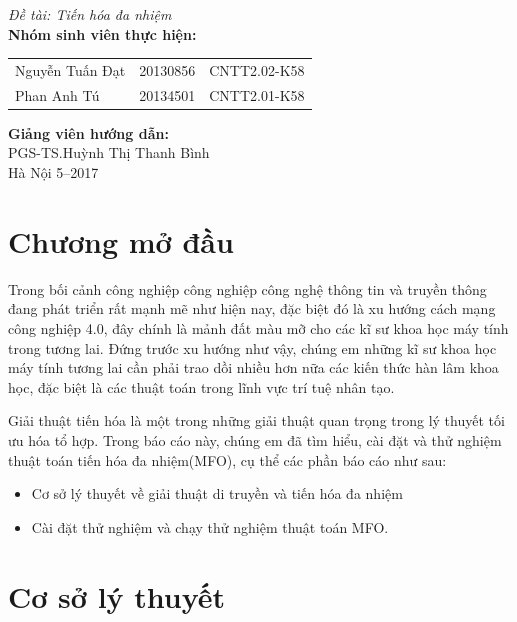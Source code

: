 \documentclass[a4paper,12pt]{report}
\renewcommand{\contentsname}{Mục lục}
\begin{document}
\begin{center}
{\fontsize{18}{20}\selectfont \emph{Đề tài: Tiến hóa đa nhiệm }}\\[2cm]
\hspace{-5cm}\fontsize{14}{16}\selectfont \textbf{Nhóm sinh viên thực hiện:}\\[0.1cm] 
\begin{longtable}{l c c}
Nguyễn Tuấn Đạt & 20130856 & CNTT2.02-K58 \\
Phan Anh Tú &   20134501 & CNTT2.01-K58\\
\end{longtable}
\vspace{0.5cm}
\hspace{-6cm}\fontsize{14}{16}\selectfont \textbf{Giảng viên hướng dẫn:}\\[0.1cm]
\hspace{-2.7cm}\fontsize{14}{16}\selectfont PGS-TS.Huỳnh Thị Thanh Bình \\[3cm]
\fontsize{16}{19}\selectfont Hà Nội 5--2017
\end{center}
\newpage
\pdfbookmark{\contentsname}{toc}
\tableofcontents
\listoffigures
\chapter*{Chương mở đầu}
Trong bối cảnh công nghiệp công nghiệp công nghệ thông tin và truyền thông đang phát triển rất mạnh mẽ như hiện nay, đặc biệt đó là xu hướng cách mạng công nghiệp 4.0, đây chính là mảnh đất màu mỡ cho các kĩ sư khoa học máy tính trong tương lai. Đứng trước xu hướng như vậy, chúng em những kĩ sư khoa học máy tính tương lai cần phải trao dồi nhiều hơn nữa các kiến thức hàn lâm khoa học, đặc biệt là các thuật toán trong lĩnh vực trí tuệ nhân tạo. 

Giải thuật tiến hóa là một trong những giải thuật quan trọng trong lý thuyết tối ưu hóa tổ hợp. Trong báo cáo này, chúng em đã tìm hiểu, cài đặt và thử nghiệm thuật toán tiến hóa đa nhiệm(MFO), cụ thể các phần báo cáo như sau:
\begin{itemize}
\item Cơ sở lý thuyết về giải thuật di truyền và tiến hóa đa nhiệm
\item Cài đặt thử nghiệm và chạy thử nghiệm thuật toán MFO.
\end{itemize}

\chapter{Cơ sở lý thuyết}
\end{document}
